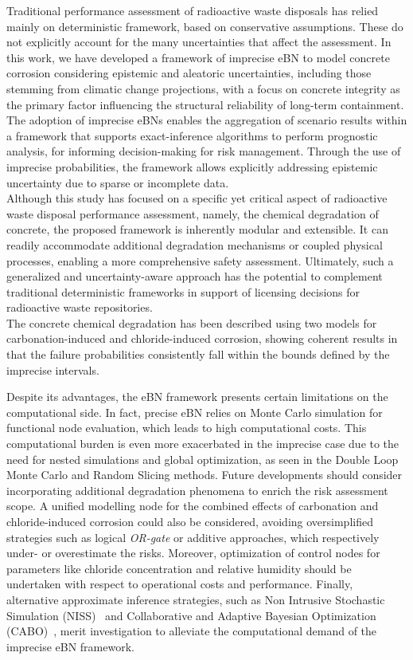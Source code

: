 Traditional performance assessment of radioactive waste disposals has relied mainly on deterministic framework, based on conservative assumptions. These do not explicitly account for the many uncertainties that affect the assessment. 
In this work, we have developed a framework of imprecise eBN to model concrete corrosion considering epistemic and aleatoric uncertainties, including those stemming from climatic change projections, with a focus on concrete integrity as the primary factor influencing the structural reliability of long-term containment.\\
The adoption of imprecise eBNs enables the aggregation of scenario results within a framework that supports exact-inference algorithms to perform prognostic analysis, for informing decision-making for risk management. Through the use of imprecise probabilities, the framework allows explicitly addressing epistemic uncertainty due to sparse or incomplete data.\\
Although this study has focused on a specific yet critical aspect of radioactive waste disposal performance assessment, namely, the chemical degradation of concrete, the proposed framework is inherently modular and extensible. It can readily accommodate additional degradation mechanisms or coupled physical processes, enabling a more comprehensive safety assessment. Ultimately, such a generalized and uncertainty-aware approach has the potential to complement traditional deterministic frameworks in support of licensing decisions for radioactive waste repositories.\\
The concrete chemical degradation has been described using two models for carbonation-induced and chloride-induced corrosion, showing coherent results in that the failure probabilities consistently fall within the bounds defined by the imprecise intervals.

Despite its advantages, the eBN framework presents certain limitations on the computational side. In fact, precise eBN relies on Monte Carlo simulation for functional node evaluation, which leads to high computational costs. This computational burden is even more exacerbated in the imprecise case due to the need for nested simulations and global optimization, as seen in the Double Loop Monte Carlo and Random Slicing methods.
Future developments should consider incorporating additional degradation phenomena to enrich the risk assessment scope. A unified modelling node for the combined effects of carbonation and chloride-induced corrosion could also be considered, avoiding oversimplified strategies such as logical \textit{OR-gate} or additive approaches, which respectively under- or overestimate the risks. Moreover, optimization of control nodes for parameters like chloride concentration and relative humidity should be undertaken with respect to operational costs and performance. Finally, alternative approximate inference strategies, such as Non Intrusive Stochastic Simulation (NISS)~\cite{wei_non-intrusive_2019} and Collaborative and Adaptive Bayesian Optimization (CABO)~\cite{hong_sequential_2024}, merit investigation to alleviate the computational demand of the imprecise eBN framework.